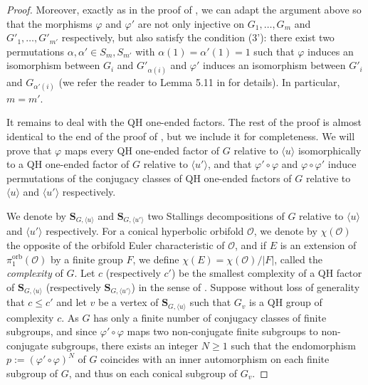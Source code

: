 \documentclass[a4paper, 11pt]{amsart}
\theoremstyle{definition}
\theoremstyle{remark}
\renewcommand{\leq}{\leqslant}
\renewcommand{\geq}{\geqslant}
\begin{document}
\begin{proof}
\smallskip \noindent
Moreover, exactly as in the proof of \cite[Lemma 5.11]{And18}, we can adapt the argument above so that the morphisms $\varphi$ and $\varphi'$ are not only injective on $G_1,\ldots,G_m$ and $G'_1,\ldots,G'_{m'}$ respectively, but also satisfy the condition (3'): there exist two permutations $\alpha,\alpha'\in S_m,S_{m'}$ with $\alpha(1)=\alpha'(1)=1$ such that $\varphi$ induces an isomorphism between $G_i$ and $G'_{\alpha(i)}$ and $\varphi'$ induces an isomorphism between $G'_i$ and $G_{\alpha'(i)}$ (we refer the reader to Lemma 5.11 in \cite{And18} for details). In particular, $m=m'$.

\smallskip \noindent
It remains to deal with the QH one-ended factors. The rest of the proof is almost identical to the end of the proof of \cite[Proposition 6.1]{AP24}, but we include it for completeness. We will prove that $\varphi$ maps every QH one-ended factor of $G$ relative to $\langle u\rangle$ isomorphically to a QH one-ended factor of $G$ relative to $\langle u'\rangle$, and that $\varphi'\circ\varphi$ and $\varphi\circ\varphi'$ induce permutations of the conjugacy classes of QH one-ended factors of $G$ relative to $\langle u\rangle$ and $\langle u'\rangle$ respectively.

\smallskip \noindent
We denote by $\mathbf{S}_{G,\langle u\rangle}$ and $\mathbf{S}_{G,\langle u'\rangle}$ two Stallings decompositions of $G$ relative to $\langle u\rangle$ and $\langle u'\rangle$ respectively. For a conical hyperbolic orbifold $\mathcal{O}$, we denote by $\chi(\mathcal{O})$ the opposite of the orbifold Euler characteristic of $\mathcal{O}$, and if $E$ is an extension of $\pi_1^{\mathrm{orb}}(\mathcal{O})$ by a finite group $F$, we define $\chi(E)=\chi(\mathcal{O})/\vert F\vert$, called the \emph{complexity} of $G$. Let $c$ (respectively $c'$) be the smallest complexity of a QH factor of $\mathbf{S}_{G,\langle u\rangle}$ (respectively $\mathbf{S}_{G,\langle u'\rangle}$) in the sense of \cite[Definition 3.4]{AP24}. Suppose without loss of generality that $c\leq c'$ and let $v$ be a vertex of $\mathbf{S}_{G,\langle u\rangle}$ such that $G_v$ is a QH group of complexity $c$. As $G$ has only a finite number of conjugacy classes of finite subgroups, and since $\varphi'\circ\varphi$ maps two non-conjugate finite subgroups to non-conjugate subgroups, there exists an integer $N\geq 1$ such that the endomorphism $p:=(\varphi'\circ\varphi)^N$ of $G$ coincides with an inner automorphism on each finite subgroup of $G$, and thus on each conical subgroup of $G_v$.


\end{proof}
\end{document}
